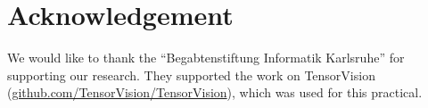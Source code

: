 
\section{Acknowledgement}\label{sec:acknowledgement}

We would like to thank the \enquote{Begabtenstiftung Informatik Karlsruhe} for
supporting our research. They supported the work on TensorVision
(\href{https://github.com/TensorVision/TensorVision}{github.com/TensorVision/TensorVision}),
which was used for this practical.
